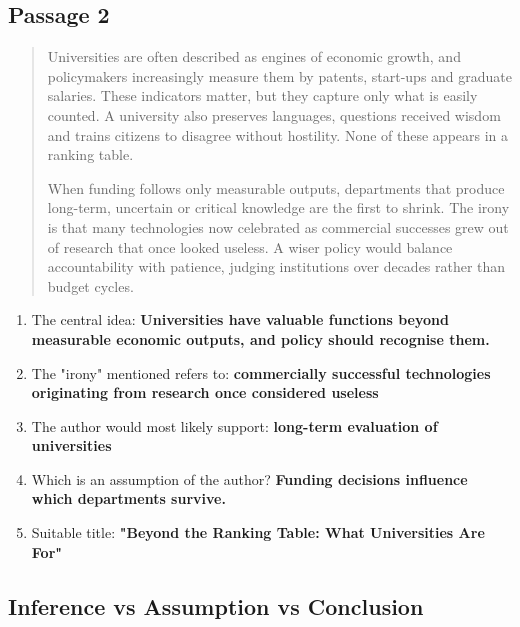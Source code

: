 \needspace{95pt}

\hypertarget{p1-03--passage-2}{%
\subsection{Passage 2}\label{p1-03--passage-2}}

\begin{quote}
Universities are often described as engines of economic growth, and policymakers increasingly
measure them by patents, start-ups and graduate salaries. These indicators matter, but they capture
only what is easily counted. A university also preserves languages, questions received wisdom and
trains citizens to disagree without hostility. None of these appears in a ranking table.

When funding follows only measurable outputs, departments that produce long-term, uncertain or
critical knowledge are the first to shrink. The irony is that many technologies now celebrated as
commercial successes grew out of research that once looked useless. A wiser policy would balance
accountability with patience, judging institutions over decades rather than budget cycles.
\end{quote}

\begin{enumerate}
\def\labelenumi{\arabic{enumi}.}
\tightlist
\item
  The central idea: \textbf{Universities have valuable functions beyond measurable economic outputs, and policy should recognise them.}
\item
  The "irony" mentioned refers to: \textbf{commercially successful technologies originating from research once considered useless}
\item
  The author would most likely support: \textbf{long-term evaluation of universities}
\item
  Which is an assumption of the author? \textbf{Funding decisions influence which departments survive.}
\item
  Suitable title: \textbf{"Beyond the Ranking Table: What Universities Are For"}
\end{enumerate}

\needspace{130pt}

\hypertarget{p1-03--inference-vs-assumption-vs-conclusion}{%
\subsection{Inference vs Assumption vs Conclusion}\label{p1-03--inference-vs-assumption-vs-conclusion}}

